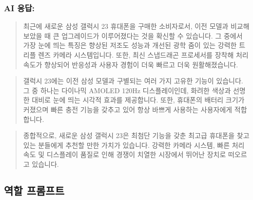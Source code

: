 \documentclass[
  letterpaper,
]{book}
\begin{document}
\begin{tcolorbox}[enhanced jigsaw, opacityback=0, opacitybacktitle=0.6, colback=white, rightrule=.15mm, coltitle=black, colframe=quarto-callout-note-color-frame, colbacktitle=quarto-callout-note-color!10!white, bottomrule=.15mm, bottomtitle=1mm, breakable, title=\textcolor{quarto-callout-note-color}{\faInfo}\hspace{0.5em}{프롬프트: ``휴대폰을 구매하는 소비자로서 이전 모델과 비교하여 새로운
삼성 갤럭시 23 휴대폰의 고유한 기능을 강조하는 객관적이고 유익한 정보를
담고 있는 휴대폰 리뷰를 작성하세요.''}, titlerule=0mm, leftrule=.75mm, toptitle=1mm, left=2mm, arc=.35mm, toprule=.15mm]

\hypertarget{ai-uxc751uxb2f5-1}{%
\subsubsection*{AI 응답:}\label{ai-uxc751uxb2f5-1}}

\begin{quote}
최근에 새로운 삼성 갤럭시 23 휴대폰을 구매한 소비자로서, 이전 모델과
비교해 보았을 때 큰 업그레이드가 이루어졌다는 것을 확신할 수 있습니다.
그 중에서 가장 눈에 띄는 특징은 향상된 저조도 성능과 개선된 광학 줌이
있는 강력한 트리플 렌즈 카메라 시스템입니다. 또한, 최신 스냅드래곤
프로세서를 장착해 처리 속도가 향상되어 반응성과 사용자 경험이 더욱
빠르고 더욱 원활해졌습니다.
\end{quote}

\begin{quote}
갤럭시 23에는 이전 삼성 모델과 구별되는 여러 가지 고유한 기능이
있습니다. 그 중 하나는 다이나믹 AMOLED 120Hz 디스플레이인데, 화려한
색상과 선명한 대비로 눈에 띄는 시각적 효과를 제공합니다. 또한, 휴대폰의
배터리 크기가 커졌으며 빠른 충전 기능을 갖추고 있어 항상 바쁘게 사용하는
사용자에게 적합합니다.
\end{quote}

\begin{quote}
종합적으로, 새로운 삼성 갤럭시 23은 최첨단 기능을 갖춘 최고급 휴대폰을
찾고 있는 분들에게 추천할 만한 가치가 있습니다. 강력한 카메라 시스템,
빠른 처리 속도 및 디스플레이 품질로 인해 경쟁이 치열한 시장에서 뛰어난
장치로 떠오르고 있습니다.
\end{quote}

\end{tcolorbox}

\hypertarget{uxc5eduxd560-uxd504uxb86cuxd504uxd2b8}{%
\subsection{역할 프롬프트}\label{uxc5eduxd560-uxd504uxb86cuxd504uxd2b8}}
\end{document}

